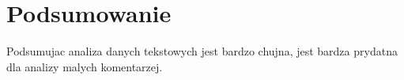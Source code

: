 \chapter*{Podsumowanie}

Podsumujac analiza danych tekstowych jest bardzo chujna, jest bardza prydatna dla analizy malych komentarzej.